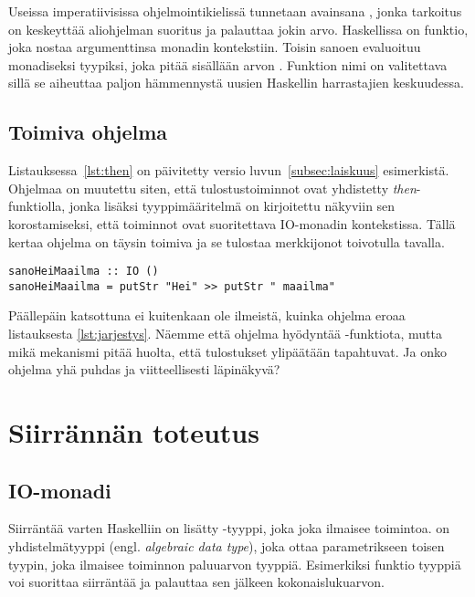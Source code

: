 \documentclass[finnish]{tktltiki2}
\begin{document}
Useissa imperatiivisissa ohjelmointikielissä tunnetaan avainsana , jonka tarkoitus on
keskeyttää aliohjelman suoritus ja palauttaa jokin arvo. Haskellissa  on funktio, joka
nostaa argumenttinsa monadin kontekstiin. Toisin sanoen  evaluoituu monadiseksi
tyypiksi, joka pitää sisällään arvon . Funktion  nimi on valitettava sillä se
aiheuttaa paljon hämmennystä uusien Haskellin harrastajien keskuudessa.

\subsection{Toimiva ohjelma}

Listauksessa~\ref{lst:then} on päivitetty versio luvun~\ref{subsec:laiskuus} esimerkistä. Ohjelmaa
on muutettu siten, että tulostustoiminnot ovat yhdistetty \emph{then}-funktiolla, jonka lisäksi
tyyppimääritelmä on kirjoitettu näkyviin sen korostamiseksi, että toiminnot ovat suoritettava
IO-monadin kontekstissa. Tällä kertaa ohjelma on täysin toimiva ja se tulostaa merkkijonot
toivotulla tavalla.

\begin{lstlisting}[float,label={lst:then},caption={Toimiva tulostus}]
sanoHeiMaailma :: IO ()
sanoHeiMaailma = putStr "Hei" >> putStr " maailma"
\end{lstlisting}

Päällepäin katsottuna ei kuitenkaan ole ilmeistä, kuinka ohjelma eroaa listauksesta
\ref{lst:jarjestys}. Näemme että ohjelma hyödyntää -funktiota, mutta mikä mekanismi pitää
huolta, että tulostukset ylipäätään tapahtuvat. Ja onko ohjelma yhä puhdas ja viitteellisesti
läpinäkyvä?


\section{Siirrännän toteutus}

\subsection{IO-monadi}

Siirräntää varten Haskelliin on lisätty -tyyppi, joka joka ilmaisee toimintoa.  on
yhdistelmätyyppi (engl. \emph{algebraic data type}), joka ottaa parametrikseen toisen tyypin, joka
ilmaisee toiminnon paluuarvon tyyppiä. Esimerkiksi funktio tyyppiä  voi suorittaa
siirräntää ja palauttaa sen jälkeen kokonaislukuarvon.
\end{document}
